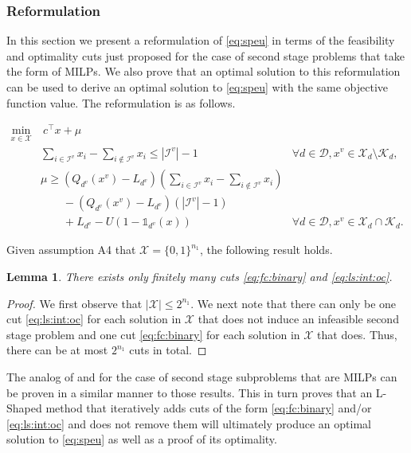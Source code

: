 \documentclass[12pt]{article}
\newtheorem{lemma}[theorem]{Lemma}%
\theoremstyle{thmstylethree}%
\newcommand{\mtc}[1] {\mathcal{#1}}
\def\Ind{\ensuremath{\mathbb{1}}}
\begin{document}
\subsubsection{Reformulation}
In this section we present a reformulation of \eqref{eq:speu} in terms of the feasibility and optimality cuts just proposed for the case of second stage problems that take the form of MILPs.
We also prove that an optimal solution to this reformulation can be used to derive an optimal solution to \eqref{eq:speu} with the same objective function value. The reformulation is as follows. 

\begin{align}\label{eq:int_reform}
     \min_{x\in \mtc{X}} &  ~c^\top x+ \mu  \\
  &\sum_{i\in\mtc{I}^v}x_i-\sum_{i\notin\mtc{I}^v}x_i\leq |\mtc{I}^v|-1    &  \forall d \in \mtc{D}, x^v \in \mtc{X}_d\setminus\mtc{K}_{d},\nonumber\\   
&\mu\geq \left(Q_{d^v}(x^v)-L_{d^v}\right)\left(\sum_{i\in\mtc{I}^v}x_i-\sum_{i\notin\mtc{I}^v}x_i\right)\nonumber\\
&\qquad -\left(Q_{d^v}(x^v)-L_{d^v}\right)\left(|\mtc{I}^v|-1\right)    \nonumber \\
&\qquad +L_{d^v}-U\left(1-\Ind_{d^v}(x)\right)  & \forall d \in \mtc{D}, x^v \in \mtc{X}_{d}\cap \mtc{K}_{d}. \nonumber
\end{align}

Given assumption A4 that $\mtc{X}=\{0,1\}^{n_1}$, the following result holds.
\begin{lemma}\label{prop:int:finite}
    There exists only finitely many cuts \eqref{eq:fc:binary} and \eqref{eq:ls:int:oc}.
\end{lemma}
\begin{proof}
We first observe that $\vert \mtc{X} \vert \leq 2^{n_1}$. 
We next note that there can only be one cut \eqref{eq:ls:int:oc} for each solution in $\mtc{X}$ that does not induce an infeasible second stage problem and one cut \eqref{eq:fc:binary} for each solution in $\mtc{X}$ that does. 
Thus, there can be at most $2^{n_1}$ cuts in total. 
\end{proof}

The analog of  and  for the case of second stage subproblems that are MILPs can be proven in a similar manner to those results.  This in turn proves that an L-Shaped method that iteratively adds cuts of the form \eqref{eq:fc:binary} and/or \eqref{eq:ls:int:oc} and does not remove them will ultimately produce an optimal solution to \eqref{eq:speu} as well as a proof of its optimality. 
\end{document}
